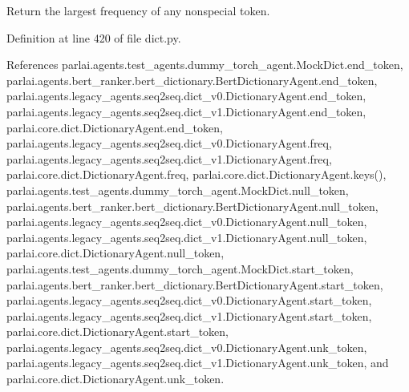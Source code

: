 \begin{DoxyVerb}Return the largest frequency of any nonspecial token.\end{DoxyVerb}
 

Definition at line 420 of file dict.\+py.



References parlai.\+agents.\+test\+\_\+agents.\+dummy\+\_\+torch\+\_\+agent.\+Mock\+Dict.\+end\+\_\+token, parlai.\+agents.\+bert\+\_\+ranker.\+bert\+\_\+dictionary.\+Bert\+Dictionary\+Agent.\+end\+\_\+token, parlai.\+agents.\+legacy\+\_\+agents.\+seq2seq.\+dict\+\_\+v0.\+Dictionary\+Agent.\+end\+\_\+token, parlai.\+agents.\+legacy\+\_\+agents.\+seq2seq.\+dict\+\_\+v1.\+Dictionary\+Agent.\+end\+\_\+token, parlai.\+core.\+dict.\+Dictionary\+Agent.\+end\+\_\+token, parlai.\+agents.\+legacy\+\_\+agents.\+seq2seq.\+dict\+\_\+v0.\+Dictionary\+Agent.\+freq, parlai.\+agents.\+legacy\+\_\+agents.\+seq2seq.\+dict\+\_\+v1.\+Dictionary\+Agent.\+freq, parlai.\+core.\+dict.\+Dictionary\+Agent.\+freq, parlai.\+core.\+dict.\+Dictionary\+Agent.\+keys(), parlai.\+agents.\+test\+\_\+agents.\+dummy\+\_\+torch\+\_\+agent.\+Mock\+Dict.\+null\+\_\+token, parlai.\+agents.\+bert\+\_\+ranker.\+bert\+\_\+dictionary.\+Bert\+Dictionary\+Agent.\+null\+\_\+token, parlai.\+agents.\+legacy\+\_\+agents.\+seq2seq.\+dict\+\_\+v0.\+Dictionary\+Agent.\+null\+\_\+token, parlai.\+agents.\+legacy\+\_\+agents.\+seq2seq.\+dict\+\_\+v1.\+Dictionary\+Agent.\+null\+\_\+token, parlai.\+core.\+dict.\+Dictionary\+Agent.\+null\+\_\+token, parlai.\+agents.\+test\+\_\+agents.\+dummy\+\_\+torch\+\_\+agent.\+Mock\+Dict.\+start\+\_\+token, parlai.\+agents.\+bert\+\_\+ranker.\+bert\+\_\+dictionary.\+Bert\+Dictionary\+Agent.\+start\+\_\+token, parlai.\+agents.\+legacy\+\_\+agents.\+seq2seq.\+dict\+\_\+v0.\+Dictionary\+Agent.\+start\+\_\+token, parlai.\+agents.\+legacy\+\_\+agents.\+seq2seq.\+dict\+\_\+v1.\+Dictionary\+Agent.\+start\+\_\+token, parlai.\+core.\+dict.\+Dictionary\+Agent.\+start\+\_\+token, parlai.\+agents.\+legacy\+\_\+agents.\+seq2seq.\+dict\+\_\+v0.\+Dictionary\+Agent.\+unk\+\_\+token, parlai.\+agents.\+legacy\+\_\+agents.\+seq2seq.\+dict\+\_\+v1.\+Dictionary\+Agent.\+unk\+\_\+token, and parlai.\+core.\+dict.\+Dictionary\+Agent.\+unk\+\_\+token.

